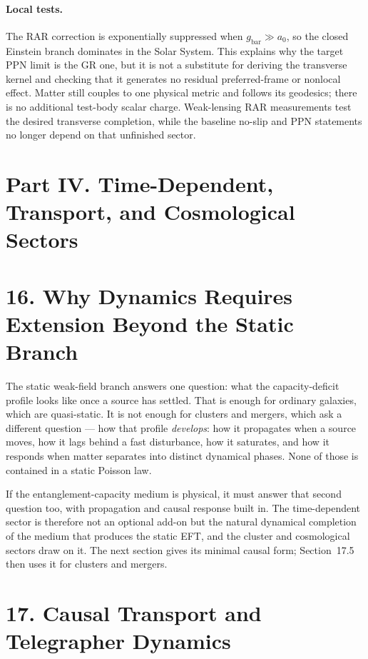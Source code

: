 \documentclass[11pt]{article}
\begin{document}
\paragraph{Local tests.}
The RAR correction is exponentially suppressed when $g_{\mathrm{bar}}\gg a_0$, so the closed Einstein branch dominates in the Solar System. This explains why the target PPN limit is the GR one, but it is not a substitute for deriving the transverse kernel and checking that it generates no residual preferred-frame or nonlocal effect. Matter still couples to one physical metric and follows its geodesics; there is no additional test-body scalar charge. Weak-lensing RAR measurements test the desired transverse completion, while the baseline no-slip and PPN statements no longer depend on that unfinished sector.

\section*{Part IV. Time-Dependent, Transport, and Cosmological Sectors}

\section{16. Why Dynamics Requires Extension Beyond the Static Branch}

The static weak-field branch answers one question: what the capacity-deficit profile looks like once a source has settled. That is enough for ordinary galaxies, which are quasi-static. It is not enough for clusters and mergers, which ask a different question --- how that profile \emph{develops}: how it propagates when a source moves, how it lags behind a fast disturbance, how it saturates, and how it responds when matter separates into distinct dynamical phases. None of those is contained in a static Poisson law.

If the entanglement-capacity medium is physical, it must answer that second question too, with propagation and causal response built in. The time-dependent sector is therefore not an optional add-on but the natural dynamical completion of the medium that produces the static EFT, and the cluster and cosmological sectors draw on it. The next section gives its minimal causal form; Section~17.5 then uses it for clusters and mergers.

\section{17. Causal Transport and Telegrapher Dynamics}
\end{document}
